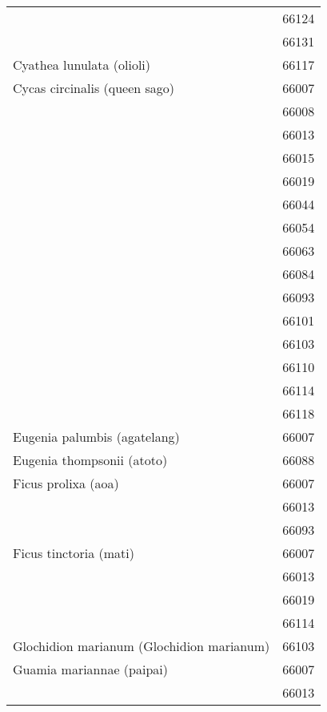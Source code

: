 \begin{longtable}{ll}
                                    & 66124 \\
                                    & 66131 \\
\midrule
Cyathea lunulata (olioli) & 66117 \\
\midrule
Cycas circinalis (queen sago) & 66007 \\
                                    & 66008 \\
                                    & 66013 \\
                                    & 66015 \\
                                    & 66019 \\
                                    & 66044 \\
                                    & 66054 \\
                                    & 66063 \\
                                    & 66084 \\
                                    & 66093 \\
                                    & 66101 \\
                                    & 66103 \\
                                    & 66110 \\
                                    & 66114 \\
                                    & 66118 \\
\midrule
Eugenia palumbis (agatelang) & 66007 \\
\midrule
Eugenia thompsonii (atoto) & 66088 \\
\midrule
Ficus prolixa (aoa) & 66007 \\
                                    & 66013 \\
                                    & 66093 \\
\midrule
Ficus tinctoria (mati) & 66007 \\
                                    & 66013 \\
                                    & 66019 \\
                                    & 66114 \\
\midrule
Glochidion marianum (Glochidion marianum) & 66103 \\
\midrule
Guamia mariannae (paipai) & 66007 \\
                                    & 66013 \\

\end{longtable}
